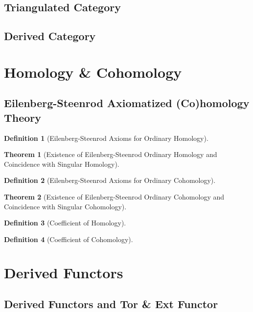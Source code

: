 \documentclass[10pt]{report}
\theoremstyle{definition}
\newtheorem{theorem}{Theorem}
\newtheorem{definition}{Definition}
\begin{document}
\subsection{Triangulated Category}
\subsection{Derived Category}

\section{Homology \& Cohomology}
\subsection{Eilenberg-Steenrod Axiomatized (Co)homology Theory}
\begin{definition}[Eilenberg-Steenrod Axioms for Ordinary Homology]

\end{definition}

\begin{theorem}[Existence of Eilenberg-Steenrod Ordinary Homology and Coincidence with Singular Homology]
\end{theorem}

\begin{definition}[Eilenberg-Steenrod Axioms for Ordinary Cohomology]

\end{definition}

\begin{theorem}[Existence of Eilenberg-Steenrod Ordinary Cohomology and Coincidence with Singular Cohomology]
\end{theorem}

\begin{definition}[Coefficient of Homology]

\end{definition}

\begin{definition}[Coefficient of Cohomology]

\end{definition}

\section{Derived Functors}

\subsection{Derived Functors and Tor \& Ext Functor}
\end{document}
